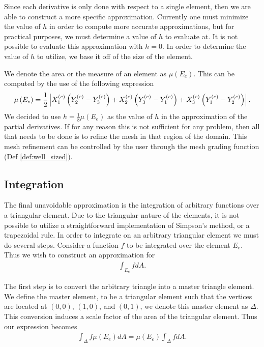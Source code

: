 \documentclass[../fem.tex]{subfile}
\begin{document}
Since each derivative is only done with respect to a single element, then we
are able to construct a more specific approximation. Currently one must
minimize the value of $h$ in order to compute more accurate approximations, but
for practical purposes, we must determine a value of $h$ to evaluate at. It is
not possible to evaluate this approximation with $h=0$. In order to determine
the value of $h$ to utilize, we base it off of the size of the element.

We denote the area or the measure of an element as $\mu\left(E_e\right)$. This
can be computed by the use of the following expression
\begin{align*}
  \mu\left(E_e\right)=\frac{1}{2}\left\vert
  X^{(e)}_1\left(Y^{(e)}_2-Y^{(e)}_3\right)+X^{(e)}_2\left(Y^{(e)}_3-Y^{(e)}_1\right)+X^{(e)}_3\left(Y^{(e)}_1-Y^{(e)}_2\right)\right\vert.
\end{align*}
We decided to use $h=\frac{1}{8}\mu\left(E_e\right)$ as the value of $h$ in the
approximation of the partial derivatives. If for any reason this is not
sufficient for any problem, then all that needs to be done is to refine the
mesh in that region of the domain. This mesh refinement can be controlled by
the user through the mesh grading function (Def \ref{def:well_sized}).

\subsection{Integration}%
\label{sub:integration}

The final unavoidable approximation is the integration of arbitrary functions
over a triangular element. Due to the triangular nature of the elements, it is
not possible to utilize a straightforward implementation of Simpson's method, or
a trapezoidal rule. In order to integrate on an arbitrary triangular element we
must do several steps. Consider a function $f$ to be integrated over the
element $E_e$. Thus we wish to construct an approximation for
\begin{align*}
  \int_{E_e}fdA.
\end{align*}

The first step is to convert the arbitrary triangle into a master triangle
element. We define the master element, to be a triangular element such that the
vertices are located at $(0,0)$, $(1,0)$, and $(0,1)$, we denote this master
element as $\Delta$. This conversion induces a scale factor of the area of the
triangular element. Thus our expression becomes
\begin{align*}
  \int_{\Delta}f\mu\left(E_e\right)dA=\mu\left(E_e\right)\int_{\Delta}fdA.
\end{align*}
\end{document}
